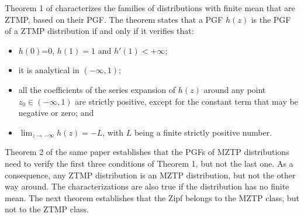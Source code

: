 \documentclass{article}
\begin{document}
Theorem 1 of \cite{valero2010zero} characterizes the families of distributions with finite mean that are ZTMP,  based on their PGF. The theorem states that a PGF $h(z)$ is the PGF of a ZTMP distribution if and only if it verifies that:
\begin{itemize}
	\item[(a)] $h(0)$=0, $h(1)=1$ and $h'(1)<+\infty$;
	\item[(b)] it is analytical in $(-\infty,1)$;
	\item[(c)] all the coefficients of the series expansion of $h(z)$ around any point $z_0 \in (-\infty,1)$ are strictly positive, except for the constant term that may be negative or zero; and
	\item[(d)] $\lim_{z \to -\infty} h(z)=-L$, with $L$ being a finite strictly positive number.
\end{itemize}
Theorem 2 of the same paper establishes that the PGFs of MZTP distributions need to verify the first three conditions of Theorem 1, but not the last one. As a consequence, any ZTMP distribution is an MZTP distribution, but not the other way around. The characterizations are also true if the distribution has no finite mean. The next theorem establishes that the Zipf belongs to the MZTP class, but not to the ZTMP class. 
\end{document}
